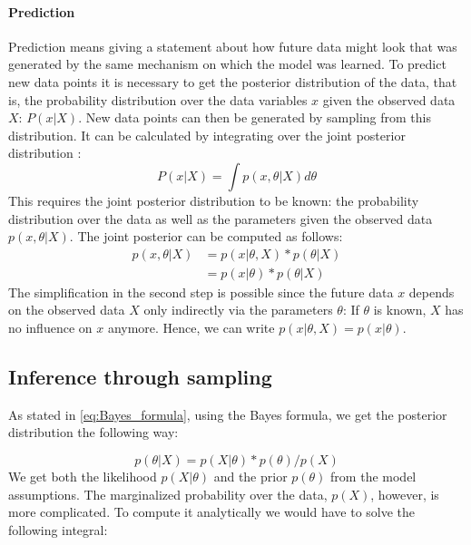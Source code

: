 \documentclass{article}
\begin{document}
\paragraph{Prediction}
Prediction means giving a statement about how future data might look that was generated by the same mechanism on which the model was learned. To predict new data points it is necessary to get the posterior distribution of the data, that is, the probability distribution over the data variables $x$ given the observed data $X$: $P(x|X)$. New data points can then be generated by sampling from this distribution. It can be calculated by integrating over the joint posterior distribution \cite{1439840954}:
\begin{equation}
P(x|X) = \int p(x,\theta|X) d\theta
\end{equation}
This requires the joint posterior distribution to be known: the probability distribution over the data as well as the parameters given the observed data $p(x,\theta|X)$. The joint posterior can be computed as follows:
\begin{equation}
\begin{aligned}
p(x,\theta|X) &	= p(x|\theta,X) * p(\theta|X) \\
 			& = p(x|\theta) * p(\theta|X)
\end{aligned}
\end{equation}
The simplification in the second step is possible since the future data $x$ depends on the observed data $X$ only indirectly via the parameters $\theta$: If $\theta$ is known, $X$ has no influence on $x$
anymore. Hence, we can write $p(x|\theta,X) = p(x|\theta)$.

\subsection{Inference through sampling}
\label{subsec:sampling}
As stated in \autoref{eq:Bayes_formula}, using the Bayes formula, we get the posterior distribution the following way:

\begin{equation}
p(\theta|X) = p(X|\theta) * p(\theta) / p(X)
\end{equation}
We get both the likelihood $p(X|\theta)$ and the prior $p(\theta)$ from the model assumptions. The marginalized probability over the data, $p(X)$, however, is more complicated. To compute it analytically we would have to solve the following integral:
\end{document}
